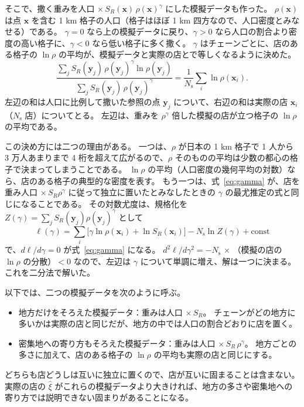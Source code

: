\documentclass[a4paper,11pt]{ltjsarticle}
\begin{document}
そこで、撒く重みを人口 $\times\, S_R(\bm{x})\, \rho(\bm{x})^{\gamma}$ にした模擬データも作った。
$\rho(\bm{x})$ は点 $\bm{x}$ を含む 1 km 格子の人口（格子はほぼ 1 km 四方なので、人口密度とみなせる）である。
$\gamma = 0$ なら上の模擬データに戻り、$\gamma > 0$ なら人口の割合より密度の高い格子に、$\gamma < 0$ なら低い格子に多く撒く。
$\gamma$ はチェーンごとに、店のある格子の $\ln\rho$ の平均が、模擬データと実際の店とで等しくなるように決めた。
\begin{equation}
  \frac{\sum_j S_R(\bm{y}_j)\, \rho(\bm{y}_j)^{\gamma} \ln\rho(\bm{y}_j)}{\sum_j S_R(\bm{y}_j)\, \rho(\bm{y}_j)^{\gamma}}
  = \frac{1}{N_{\mathrm{s}}} \sum_i \ln\rho(\bm{x}_i).
  \label{eq:gamma}
\end{equation}
左辺の和は人口に比例して撒いた参照の点 $\bm{y}_j$ について、右辺の和は実際の店 $\bm{x}_i$（$N_{\mathrm{s}}$ 店）についてとる。
左辺は、重みを $\rho^\gamma$ 倍した模擬の店が立つ格子の $\ln\rho$ の平均である。

この決め方には二つの理由がある。
一つは、$\rho$ が日本の 1 km 格子で 1 人から 3 万人あまりまで 4 桁を超えて広がるので、$\rho$ そのものの平均は少数の都心の格子で決まってしまうことである。
$\ln\rho$ の平均（人口密度の幾何平均の対数）なら、店のある格子の典型的な密度を表す。
もう一つは、式~\eqref{eq:gamma} が、店を重み人口 $\times\, S_R \rho^\gamma$ に従って独立に置いたとみなしたときの $\gamma$ の最尤推定の式と同じになることである。
その対数尤度は、規格化を $Z(\gamma) = \sum_j S_R(\bm{y}_j)\rho(\bm{y}_j)^\gamma$ として
\begin{equation}
  \ell(\gamma) = \sum_i \bigl[\gamma \ln\rho(\bm{x}_i) + \ln S_R(\bm{x}_i)\bigr] - N_{\mathrm{s}} \ln Z(\gamma) + \text{const}
\end{equation}
で、$d\ell/d\gamma = 0$ が式~\eqref{eq:gamma} になる。
$d^2\ell/d\gamma^2 = -N_{\mathrm{s}}$ × （模擬の店の $\ln\rho$ の分散）$< 0$ なので、左辺は $\gamma$ について単調に増え、解は一つに決まる。
これを二分法で解いた。

以下では、二つの模擬データを次のように呼ぶ。
\begin{itemize}
  \item 地方だけをそろえた模擬データ：重みは人口 $\times\, S_R$。
    チェーンがどの地方に多いかは実際の店と同じだが、地方の中では人口の割合どおりに店を置く。
  \item 密集地への寄り方もそろえた模擬データ：重みは人口 $\times\, S_R\, \rho^\gamma$。
    地方ごとの多さに加えて、店のある格子の $\ln\rho$ の平均も実際の店と同じにする。
\end{itemize}
どちらも店どうしは互いに独立に置くので、店が互いに固まることは含まない。
実際の店の $\hat\xi$ がこれらの模擬データより大きければ、地方の多さや密集地への寄り方では説明できない固まりがあることになる。
\end{document}
